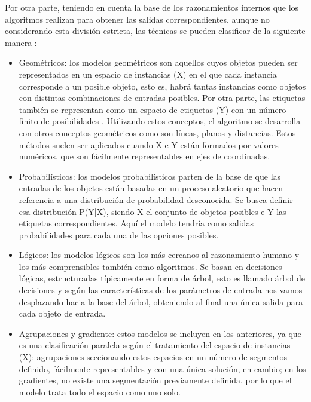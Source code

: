 \par Por otra parte, teniendo en cuenta la base de los razonamientos internos que los algoritmos realizan para obtener las salidas correspondientes, aunque no considerando esta división estricta, las técnicas se pueden clasificar de la siguiente manera \cite{MLFlach}:
\begin{itemize}
	\item Geométricos: los modelos geométricos son aquellos cuyos objetos pueden ser representados en un espacio de instancias (X) en el que cada instancia corresponde a un posible objeto, esto es, habrá tantas instancias como objetos con distintas combinaciones de entradas posibles. Por otra parte, las etiquetas también se representan como un espacio de etiquetas (Y) con un número finito de posibilidades \citep{MLPref}. Utilizando estos conceptos, el algoritmo se desarrolla con otros conceptos geométricos como son líneas, planos y distancias. Estos métodos suelen ser aplicados cuando X e Y están formados por valores numéricos, que son fácilmente representables en ejes de coordinadas.
	\item Probabilísticos: los modelos probabilísticos parten de la base de que las entradas de los objetos están basadas en un proceso aleatorio que hacen referencia a una distribución de probabilidad desconocida. Se busca definir esa distribución P(Y|X), siendo X el conjunto de objetos posibles e Y las etiquetas correspondientes. Aquí el modelo tendría como salidas probabilidades para cada una de las opciones posibles. 
	\item Lógicos: los modelos lógicos son los más cercanos al razonamiento humano y los más comprensibles también como algoritmos. Se basan en decisiones lógicas, estructuradas típicamente en forma de árbol, esto es llamado árbol de decisiones y según las características de los parámetros de entrada nos vamos desplazando hacia la base del árbol, obteniendo al final una única salida para cada objeto de entrada. 
	\item Agrupaciones y gradiente: estos modelos se incluyen en los anteriores, ya que es una clasificación paralela según el tratamiento del espacio de instancias (X): agrupaciones seccionando estos espacios en un número de segmentos definido, fácilmente representables y con una única solución, en cambio; en los gradientes, no existe una segmentación previamente definida, por lo que el modelo trata todo el espacio como uno solo. 
\end{itemize}

